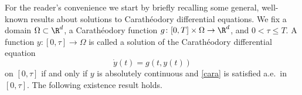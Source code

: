 For the reader's convenience we start by briefly recalling some general, well-known results about solutions to Carath{\'e}odory differential equations. We fix a domain $\Omega \subset \R^d$, a Carath{\'e}odory function $g\colon[0,T]\times \Omega \to \R^d$, and $0<\tau \le T$. A function $y\colon [0,\tau]\to \Omega$ is called a solution of the Carath{\'e}odory differential equation
\begin{equation}\label{cara}
\dot y(t)=g(t, y(t))
\end{equation}
on $[0,\tau]$ if and only if $y$ is absolutely continuous and \eqref{cara} is satisfied a.e.\ in $[0,\tau]$.
The following existence result holds.
%
%
%

